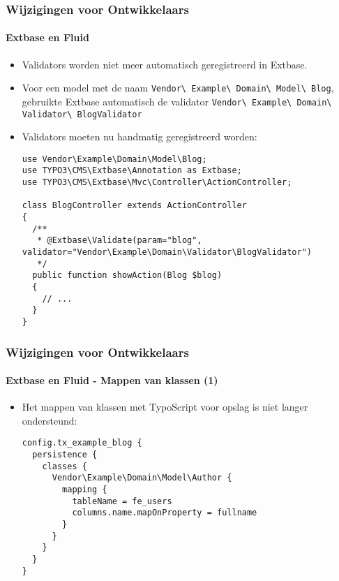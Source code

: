 \begin{frame}[fragile]
	\frametitle{Wijzigingen voor Ontwikkelaars}
	\framesubtitle{Extbase en Fluid}

	\lstset{basicstyle=\tiny\ttfamily}

	\begin{itemize}
		\item Validators worden niet meer automatisch geregistreerd in Extbase.
		\item Voor een model met de naam
			\small\texttt{Vendor\textbackslash
				Example\textbackslash
				Domain\textbackslash
				Model\textbackslash
				Blog}\normalsize,\newline
			gebruikte Extbase automatisch de validator
			\small\texttt{Vendor\textbackslash
				Example\textbackslash
				Domain\textbackslash
				Validator\textbackslash
				BlogValidator}\normalsize

		\item Validators moeten nu handmatig geregistreerd worden:

\begin{lstlisting}
use Vendor\Example\Domain\Model\Blog;
use TYPO3\CMS\Extbase\Annotation as Extbase;
use TYPO3\CMS\Extbase\Mvc\Controller\ActionController;

class BlogController extends ActionController
{
  /**
   * @Extbase\Validate(param="blog", validator="Vendor\Example\Domain\Validator\BlogValidator")
   */
  public function showAction(Blog $blog)
  {
    // ...
  }
}
\end{lstlisting}

	\end{itemize}

\end{frame}


\begin{frame}[fragile]
	\frametitle{Wijzigingen voor Ontwikkelaars}
	\framesubtitle{Extbase en Fluid - Mappen van klassen (1)}

	\lstset{basicstyle=\tiny\ttfamily}

	\begin{itemize}
		\item Het mappen van klassen met TypoScript voor opslag is niet langer ondersteund:

\begin{lstlisting}
config.tx_example_blog {
  persistence {
    classes {
      Vendor\Example\Domain\Model\Author {
        mapping {
          tableName = fe_users
          columns.name.mapOnProperty = fullname
        }
      }
    }
  }
}
\end{lstlisting}

	\end{itemize}

\end{frame}

